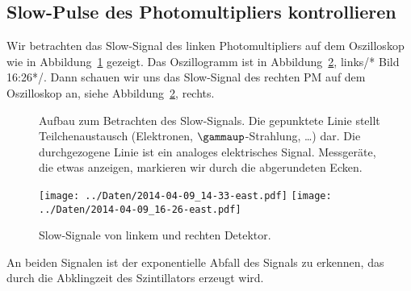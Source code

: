\subsection{Slow-Pulse des Photomultipliers kontrollieren}

Wir betrachten das Slow-Signal des linken Photomultipliers auf dem Oszilloskop
wie in Abbildung~\ref{fig:aufbau:slow} gezeigt. Das Oszillogramm ist in
Abbildung~\ref{fig:slow_signal}, links/* Bild 16:26*/. Dann schauen wir uns das
Slow-Signal des rechten PM auf dem Oszilloskop an, siehe
Abbildung~\ref{fig:slow_signal}, rechts.

\begin{figure}[htbp]
    \centering
    \caption{%
        Aufbau zum Betrachten des Slow-Signals. Die gepunktete Linie stellt
        Teilchenaustausch (Elektronen, $\gammaup$-Strahlung, …) dar. Die
        durchgezogene Linie ist ein analoges elektrisches Signal. Messgeräte,
        die etwas anzeigen, markieren wir durch die abgerundeten Ecken.
    }
    \label{fig:aufbau:slow}
\end{figure}

\begin{figure}[htbp]
    \centering
    \texttt{[image: ../Daten/2014-04-09\_14-33-east.pdf]}
    \hfill
    \texttt{[image: ../Daten/2014-04-09\_16-26-east.pdf]}
    \caption{%
        Slow-Signale von linkem und rechten Detektor.
    }
    \label{fig:slow_signal}
\end{figure}

An beiden Signalen ist der exponentielle Abfall des Signals zu erkennen, das
durch die Abklingzeit des Szintillators erzeugt wird.

